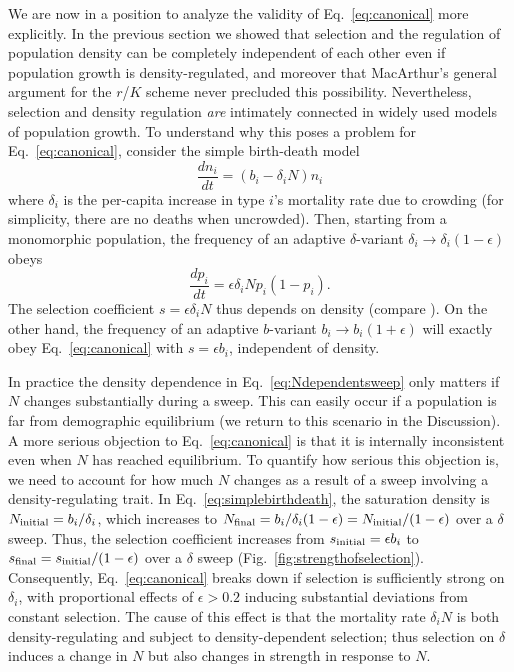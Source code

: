 \documentclass[11pt]{article}
\begin{document}
We are now in a position to analyze the validity of Eq.~\eqref{eq:canonical} more explicitly. In the previous section we showed that selection and the regulation of population density can be completely independent of each other even if population growth is density-regulated, and moreover that MacArthur's general argument \citep{macarthur_1967} for the $r$/$K$ scheme never precluded this possibility. Nevertheless, selection and density regulation \textit{are} intimately connected in widely used models of population growth. To understand why this poses a problem for Eq.~\eqref{eq:canonical}, consider the simple birth-death model \cite[pp. 20]{kostitzin_1939} 
\begin{equation}
\frac{d n_i}{dt}=(b_i -\delta_iN) n_i \label{eq:simplebirthdeath}
\end{equation}
where $\delta_i$ is the per-capita increase in type $i$'s mortality rate due to crowding (for simplicity, there are no deaths when uncrowded). Then, starting from a monomorphic population, the frequency of an adaptive $\delta$-variant $\delta_i\rightarrow \delta_i(1-\epsilon)$ obeys 
\begin{equation}
\frac{d p_i}{dt}=\epsilon \delta_i N p_i(1-p_i). \label{eq:Ndependentsweep}
\end{equation}
The selection coefficient $s=\epsilon \delta_i N$ thus depends on density (compare \cite[pp. 29]{crow_1970}). On the other hand, the frequency of an adaptive $b$-variant $b_i\rightarrow b_i(1+\epsilon)$ will exactly obey Eq.~\eqref{eq:canonical} with $s=\epsilon b_i$, independent of density.

In practice the density dependence in Eq.~\eqref{eq:Ndependentsweep} only matters if $N$ changes substantially during a sweep. This can easily occur if a population is far from demographic equilibrium (we return to this scenario in the Discussion). A more serious objection to Eq.~\eqref{eq:canonical} is that it is internally inconsistent even when $N$ has reached equilibrium. To quantify how serious this objection is, we need to account for how much $N$ changes as a result of a sweep involving a density-regulating trait. In Eq.~\eqref{eq:simplebirthdeath}, the saturation density is $N_{\rm initial}=b_i/\delta_i$, which increases to $N_{\rm final}=b_i/\delta_i(1-\epsilon)=N_{\rm initial}/(1-\epsilon)$ over a $\delta$ sweep. Thus, the selection coefficient increases from $s_{\rm initial}= \epsilon b_i$ to $s_{\rm final}=s_{\rm initial}/(1-\epsilon)$ over a $\delta$ sweep (Fig.~\ref{fig:strengthofselection}). Consequently, Eq.~\eqref{eq:canonical} breaks down if selection is sufficiently strong on $\delta_i$, with proportional effects of $\epsilon>0.2$ inducing substantial deviations from constant selection. The cause of this effect is that the mortality rate $\delta_i N$ is both density-regulating and subject to density-dependent selection; thus selection on $\delta$ induces a change in $N$ but also changes in strength in response to $N$.
\end{document}

